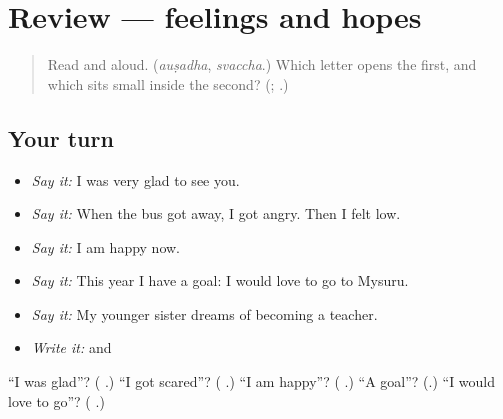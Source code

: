 \section[(review)]{Review — feelings and hopes}

\label{lesson:KA-R315-feelings-and-hopes}



\begin{quote}
Read \textbf{} and \textbf{} aloud. (\emph{auṣadha}, \emph{svaccha}.) Which letter opens the first, and which sits small inside the second? (\textbf{}; \textbf{}.)
\end{quote}

\subsection*{Your turn}
\begin{itemize}
\raggedright
  \item \emph{Say it:} I was very glad to see you.
  \item \emph{Say it:} When the bus got away, I got angry. Then I felt low.
  \item \emph{Say it:} I am happy now.
  \item \emph{Say it:} This year I have a goal: I would love to go to Mysuru.
  \item \emph{Say it:} My younger sister dreams of becoming a teacher.
  \item \emph{Write it:} \textbf{} and \textbf{}
\end{itemize}

\begin{tcolorbox}[breakable,colback=teal!4,colframe=teal!35!black,title={Before you move on}]
\textquotedblleft{}I was glad\textquotedblright{}? (\textbf{  }.) \textquotedblleft{}I got scared\textquotedblright{}? (\textbf{ }.) \textquotedblleft{}I am happy\textquotedblright{}? (\textbf{ }.) \textquotedblleft{}A goal\textquotedblright{}? (\textbf{}.) \textquotedblleft{}I would love to go\textquotedblright{}? (\textbf{   }.)
\end{tcolorbox}
